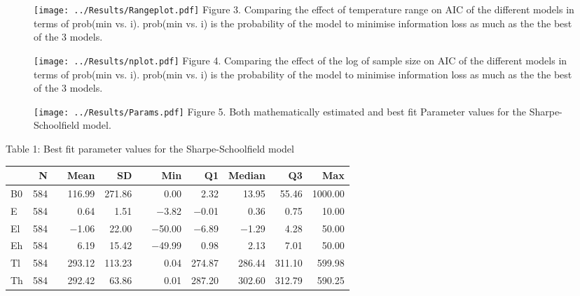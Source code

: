 \documentclass[fontsize=11pt]{scrartcl}\usepackage[]{graphicx}\usepackage[]{color}
\begin{document}
  \begin{figure}[]
    \texttt{[image: ../Results/Rangeplot.pdf]}
    Figure 3. Comparing the effect of temperature range on AIC of the different models in terms of prob(min vs. i). 
    prob(min vs. i) is the probability of the model to minimise information loss as much as the the best of the 3 models.
  \end{figure}

  \begin{figure}[]
    \texttt{[image: ../Results/nplot.pdf]}
    Figure 4. Comparing the effect of the log of sample size on AIC of the different models in terms of prob(min vs. i). 
    prob(min vs. i) is the probability of the model to minimise information loss as much as the the best of the 3 models.
  \end{figure}

  \begin{figure}[]
    \texttt{[image: ../Results/Params.pdf]}
    Figure 5. Both mathematically estimated and best fit Parameter values for the Sharpe-Schoolfield model.
  \end{figure}

  \begin{table}
    Table 1: Best fit parameter values for the Sharpe-Schoolfield model
\begin{center}
\begin{longtable}{lrrrrrrrrrr}
  \toprule
   & N &   & Mean & SD &   & Min & Q1 & Median & Q3 & Max \\ 
    \cmidrule{2-2}  \cmidrule{4-5} \cmidrule{7-11}
 \endhead
B0 & 584 &  & 116.99 & 271.86 &  & 0.00 & 2.32 & 13.95 & 55.46 & 1000.00 \\ 
  E & 584 &  & 0.64 & 1.51 &  & $-$3.82 & $-$0.01 & 0.36 & 0.75 & 10.00 \\ 
  El & 584 &  & $-$1.06 & 22.00 &  & $-$50.00 & $-$6.89 & $-$1.29 & 4.28 & 50.00 \\ 
  Eh & 584 &  & 6.19 & 15.42 &  & $-$49.99 & 0.98 & 2.13 & 7.01 & 50.00 \\ 
  Tl & 584 &  & 293.12 & 113.23 &  & 0.04 & 274.87 & 286.44 & 311.10 & 599.98 \\ 
  Th & 584 &  & 292.42 & 63.86 &  & 0.01 & 287.20 & 302.60 & 312.79 & 590.25 \\ 
   \bottomrule
\end{longtable}
\end{center}

  \end{table}
\end{document}
